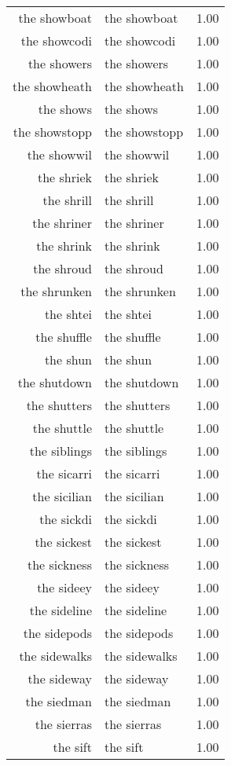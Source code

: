 \begin{table}[ht]
\begin{tabular}{rlr}
  the showboat & the showboat & 1.00 \\ 
  the showcodi & the showcodi & 1.00 \\ 
  the showers & the showers & 1.00 \\ 
  the showheath & the showheath & 1.00 \\ 
  the shows & the shows & 1.00 \\ 
  the showstopp & the showstopp & 1.00 \\ 
  the showwil & the showwil & 1.00 \\ 
  the shriek & the shriek & 1.00 \\ 
  the shrill & the shrill & 1.00 \\ 
  the shriner & the shriner & 1.00 \\ 
  the shrink & the shrink & 1.00 \\ 
  the shroud & the shroud & 1.00 \\ 
  the shrunken & the shrunken & 1.00 \\ 
  the shtei & the shtei & 1.00 \\ 
  the shuffle & the shuffle & 1.00 \\ 
  the shun & the shun & 1.00 \\ 
  the shutdown & the shutdown & 1.00 \\ 
  the shutters & the shutters & 1.00 \\ 
  the shuttle & the shuttle & 1.00 \\ 
  the siblings & the siblings & 1.00 \\ 
  the sicarri & the sicarri & 1.00 \\ 
  the sicilian & the sicilian & 1.00 \\ 
  the sickdi & the sickdi & 1.00 \\ 
  the sickest & the sickest & 1.00 \\ 
  the sickness & the sickness & 1.00 \\ 
  the sideey & the sideey & 1.00 \\ 
  the sideline & the sideline & 1.00 \\ 
  the sidepods & the sidepods & 1.00 \\ 
  the sidewalks & the sidewalks & 1.00 \\ 
  the sideway & the sideway & 1.00 \\ 
  the siedman & the siedman & 1.00 \\ 
  the sierras & the sierras & 1.00 \\ 
  the sift & the sift & 1.00 \\ 

\end{tabular}
\end{table}
